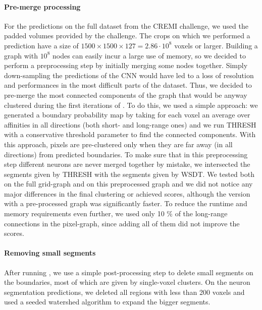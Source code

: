  \paragraph{Pre-merge processing} For the predictions on the full dataset from the CREMI challenge, we used  the padded volumes provided by the challenge. The crops on which we performed a prediction have a size of $1500\times1500\times127=2.86\cdot 10^8$ voxels or larger. Building a graph with $10^8$ nodes can easily incur a large use of memory, so we decided to perform a preprocessing step by initially merging some nodes together. Simply down-sampling the predictions of the CNN would have led to a loss of resolution and performances in the most difficult parts of the dataset. Thus, we decided to pre-merge the most connected components of the graph that would be anyway clustered during the first iterations of \algname{}. To do this, we used a simple approach: we generated a boundary probability map by taking for each voxel an average over affinities in all directions (both short- and long-range ones) and we run THRESH with a conservative threshold parameter to find the connected components. With this approach, pixels are pre-clustered only when they are far away (in all directions) from predicted boundaries. 
 To make sure that in this preprocessing step different neurons are never merged together by mistake, we intersected the segments given by THRESH with the segments given by WSDT. 
 We tested \algname{} both on the full grid-graph and on this preprocessed graph and we did not notice any major differences in the final clustering or achieved scores, although the version with a pre-processed graph was significantly faster. To reduce the runtime and memory requirements even further, we used only 10 \% of the long-range connections in the pixel-graph, since adding all of them did not improve the scores.  
 
 \paragraph{Removing small segments} After running \algname{}, we use a simple post-processing step to delete small segments on the boundaries, most of which are given by single-voxel clusters. On the neuron segmentation predictions, we deleted all regions with less than 200 voxels and used a seeded watershed algorithm to expand the bigger segments.

